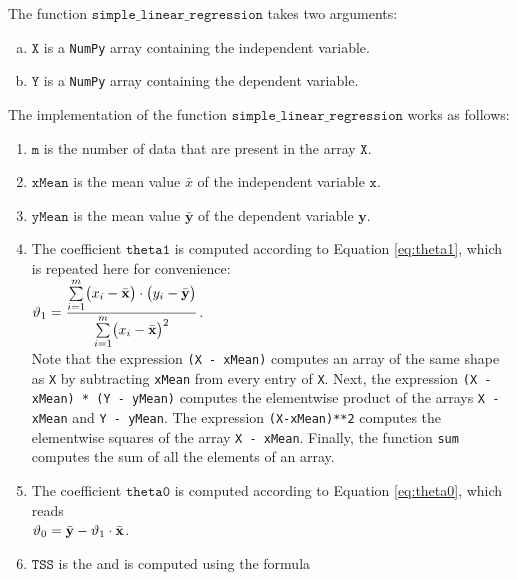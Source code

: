 \noindent
The function $\mathtt{simple\_linear\_regression}$ takes two arguments:
\begin{enumerate}[(a)]
\item $\mathtt{X}$ is a \texttt{NumPy} array containing the independent variable.
\item $\mathtt{Y}$ is a \texttt{NumPy} array containing the dependent variable.
\end{enumerate}
The implementation of the function $\mathtt{simple\_linear\_regression}$ works as follows:
\begin{enumerate}
\item $\mathtt{m}$ is the number of data that are present in the array $\texttt{X}.$
\item $\mathtt{xMean}$ is the mean value $\bar{x}$ of the independent variable $\mathtt{x}$.
\item $\mathtt{yMean}$ is the mean value $\bar{\mathbf{y}}$ of the dependent variable $\mathbf{y}$. 
\item The coefficient $\mathtt{theta1}$ is computed according to Equation \ref{eq:theta1}, which is repeated
      here for convenience:
      \\[0.2cm]
      \hspace*{1.3cm}
      $\displaystyle\vartheta_1 = \frac{\sum\limits_{i=1}^m \bigl(x_i - \bar{\mathbf{x}}\bigr) \cdot \bigl(y_i - \bar{\mathbf{y}}\bigr)}{
                        \sum\limits_{i=1}^m \bigl(x_i - \bar{\mathbf{x}}\bigr)^2}  
      $.
      \\[0.2cm]
      Note that the expression \texttt{(X - xMean)} computes an array of the same shape as \texttt{X}
      by subtracting \texttt{xMean} from every entry of \texttt{X}.
      Next, the expression \texttt{(X - xMean) * (Y - yMean)} computes the elementwise product
      of the arrays \texttt{X - xMean} and \texttt{Y - yMean}.
      The expression \texttt{(X-xMean)**2} computes the elementwise squares of the array \texttt{X - xMean}.
      Finally, the function \texttt{sum} computes the sum of all the elements of an array.
\item The coefficient $\mathtt{theta0}$ is computed according to Equation \ref{eq:theta0}, which reads
      \\[0.2cm]
      \hspace*{1.3cm}
      $\displaystyle\vartheta_0 = \bar{\mathbf{y}} - \vartheta_1 \cdot \bar{\mathbf{x}}$.
\item $\mathtt{TSS}$ is the  and is computed using the formula
      \\[0.2cm]

\end{enumerate}
